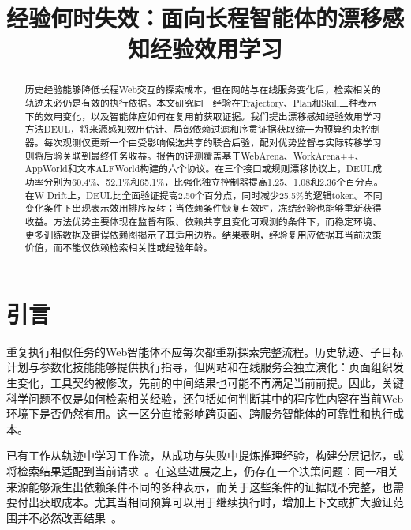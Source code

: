 \documentclass[sigconf,anonymous,review]{acmart}
\theoremstyle{zhplain}
\begin{document}
\title[When Experience Goes Stale]{经验何时失效：面向长程智能体的漂移感知经验效用学习}
\begin{abstract}
历史经验能够降低长程Web交互的探索成本，但在网站与在线服务变化后，检索相关的轨迹未必仍是有效的执行依据。本文研究同一经验在Trajectory、Plan和Skill三种表示下的效用变化，以及智能体应如何在复用前获取证据。我们提出漂移感知经验效用学习方法DEUL，将来源感知效用估计、局部依赖过滤和序贯证据获取统一为预算约束控制器。每次观测仅更新一个由受影响候选共享的联合后验，配对优势监督与实际转移学习则将后验关联到最终任务收益。报告的评测覆盖基于WebArena、WorkArena++、AppWorld和文本ALFWorld构建的六个协议。在三个接口或规则漂移协议上，DEUL成功率分别为60.4\%、52.1\%和65.1\%，比强化独立控制器提高1.25、1.08和2.36个百分点。在W-Drift上，DEUL比全面验证提高2.50个百分点，同时减少25.5\%的逻辑token。不同变化条件下出现表示效用排序反转；当依赖条件恢复有效时，冻结经验也能够重新获得收益。方法优势主要体现在监督有限、依赖共享且变化可观测的条件下，而稳定环境、更多训练数据及错误依赖图揭示了其适用边界。结果表明，经验复用应依据其当前决策价值，而不能仅依赖检索相关性或经验年龄。
\end{abstract}


\maketitle

\section{引言}
\label{sec:intro}
重复执行相似任务的Web智能体不应每次都重新探索完整流程。历史轨迹、子目标计划与参数化技能能够提供执行指导，但网站和在线服务会独立演化：页面组织发生变化，工具契约被修改，先前的中间结果也可能不再满足当前前提。因此，关键科学问题不仅是如何检索相关经验，还包括如何判断其中的程序性内容在当前Web环境下是否仍然有用。这一区分直接影响跨页面、跨服务智能体的可靠性和执行成本。

已有工作从轨迹中学习工作流，从成功与失败中提炼推理经验，构建分层记忆，或将检索结果适配到当前请求~\cite{awm,reasoningbank,hepm,hmt,qcr}。在这些进展之上，仍存在一个决策问题：同一相关来源能够派生出依赖条件不同的多种表示，而关于这些条件的证据既不完整，也需要付出获取成本。尤其当相同预算可以用于继续执行时，增加上下文或扩大验证范围并不必然改善结果~\cite{budgetstudy}。
\end{document}
